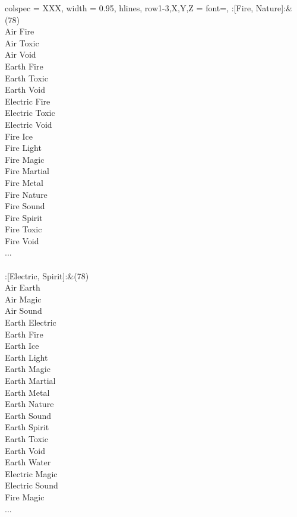 \begin{longtblr}[
	caption = {2v2 Defending Weak},
	label = {2v2-Defending-Weak},
]{
	colspec = {XXX}, width = 0.95\linewidth,
	hlines,
	row{1-3,X,Y,Z} = {font=\bfseries},
}
	:[Fire, Nature]:&{(78)\\
	Air Fire \\
	Air Toxic \\
	Air Void \\
	Earth Fire \\
	Earth Toxic \\
	Earth Void \\
	Electric Fire \\
	Electric Toxic \\
	Electric Void \\
	Fire Ice \\
	Fire Light \\
	Fire Magic \\
	Fire Martial \\
	Fire Metal \\
	Fire Nature \\
	Fire Sound \\
	Fire Spirit \\
	Fire Toxic \\
	Fire Void \\
	...\\
	}\\

	:[Electric, Spirit]:&{(78)\\
	Air Earth \\
	Air Magic \\
	Air Sound \\
	Earth Electric \\
	Earth Fire \\
	Earth Ice \\
	Earth Light \\
	Earth Magic \\
	Earth Martial \\
	Earth Metal \\
	Earth Nature \\
	Earth Sound \\
	Earth Spirit \\
	Earth Toxic \\
	Earth Void \\
	Earth Water \\
	Electric Magic \\
	Electric Sound \\
	Fire Magic \\
	...\\
	}\\


\end{longtblr}
